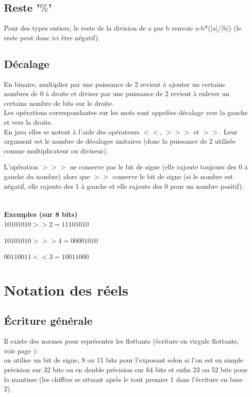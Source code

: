 \documentclass[a4paper,10pt]{book}
\begin{document}
\subsection{Reste '$\%$'}
Pour des types entiers, le reste de la division de a par b renvoie a-b*(|a|/|b|) (le reste peut donc ici être négatif).

\subsection{Décalage}
En binaire, multiplier par une puissance de 2 revient à ajouter un certains nombres de 0 à droite et diviser par une puissance de 2 revient à enlever un certains nombre de bits sur le droite.\\

Les opérations correspondantes sur les mots sont appelées décalage vers la gauche et vers la droite.\\

En java elles se notent à l’aide des opérateurs $<<$, $>>>$ et $>>$. Leur argument est le nombre de décalages unitaires (donc la puissance de 2 utilisée comme multiplicateur ou diviseur).

L'opération $>>>$ ne conserve pas le bit de signe (elle rajoute toujours des 0 à gauche du nombre) alors que $>>$ conserve le bit de signe (si le nombre est négatif, elle rajoute des 1 à gauche et elle rajoute des 0 pour un nombre positif).\\\\\\

\textbf{Exemples (sur 8 bits)}\\

$10101010 >> 2 = 11101010$

$10101010 >>> 4 = 00001010$

$00110011 << 3 = 10011000$

\newpage

\section{Notation des réels}
\subsection{Écriture générale}
Il existe des normes pour représenter les flottants (écriture en virgule flottante, voir page \pageref{flottant}):\\
on utilise un bit de signe, 8 ou 11 bits pour l'exposant selon si l'on est en simple précision sur 32 bits ou en double précision sur 64 bits et enfin 23 ou 52 bits pour la mantisse (les chiffres se situant après le tout premier 1 dans l'écriture en base 2).\\
\end{document}
